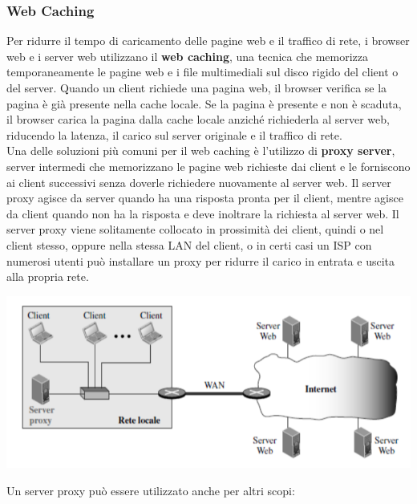 \documentclass[12pt]{report}
\begin{document}
	\subsubsection{Web Caching}
	Per ridurre il tempo di caricamento delle pagine web e il traffico di rete, i browser web e i server web utilizzano il \textbf{web caching}, una tecnica che memorizza temporaneamente le pagine web e i file multimediali sul disco rigido del client o del server. Quando un client richiede una pagina web, il browser verifica se la pagina è già presente nella cache locale. Se la pagina è presente e non è scaduta, il browser carica la pagina dalla cache locale anziché richiederla al server web, riducendo la latenza, il carico sul server originale e il traffico di rete. 
	\vspace{\baselineskip}\\
	Una delle soluzioni più comuni per il web caching è l'utilizzo di \textbf{proxy server}, server intermedi che memorizzano le pagine web richieste dai client e le forniscono ai client successivi senza doverle richiedere nuovamente al server web. Il server proxy agisce da server quando ha una risposta pronta per il client, mentre agisce da client quando non ha la risposta e deve inoltrare la richiesta al server web. Il server proxy viene solitamente collocato in prossimità dei client, quindi o nel client stesso, oppure nella stessa LAN del client, o in certi casi un ISP con numerosi utenti può installare un proxy per ridurre il carico in entrata e uscita alla propria rete.
	\begin{center}
		\includegraphics[scale=0.5]{assets/proxy-pos.png}
	\end{center}
	Un server proxy può essere utilizzato anche per altri scopi:
\end{document}
